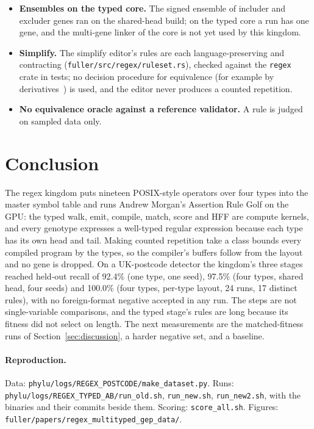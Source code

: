\documentclass[sigconf,nonacm]{acmart}
\newcommand{\src}[1]{{\small\nolinkurl{#1}}}
\begin{document}
\begin{itemize}
no multilingual measurement is reported.
\item \textbf{Ensembles on the typed core.} The signed ensemble of includer and
excluder genes ran on the shared-head build; on the typed core a run has one
gene, and the multi-gene linker of the core is not yet used by this kingdom.
\item \textbf{Simplify.} The simplify editor's rules are each language-preserving
and contracting (\src{fuller/src/regex/ruleset.rs}), checked against the
\texttt{regex} crate in tests; no decision procedure for equivalence (for example
by derivatives~\cite{brzozowski1964derivatives}) is used, and the editor never
produces a counted repetition.
\item \textbf{No equivalence oracle against a reference validator.} A rule is
judged on sampled data only.
\end{itemize}

\section{Conclusion}
\label{sec:conclusion}

The regex kingdom puts nineteen POSIX-style operators over four types into the
master symbol table and runs Andrew Morgan's Assertion Rule Golf on the GPU: the
typed walk, emit, compile, match, score and HFF are compute kernels, and every
genotype expresses a well-typed regular expression because each type has its own
head and tail. Making counted repetition take a class bounds every compiled
program by the types, so the compiler's buffers follow from the layout and no gene
is dropped. On a UK-postcode detector the kingdom's three stages reached held-out
recall of 92.4\% (one type, one seed), 97.5\% (four types, shared head, four
seeds) and 100.0\% (four types, per-type layout, 24 runs, 17 distinct rules), with no foreign-format
negative accepted in any run. The steps are not single-variable comparisons, and
the typed stage's rules are long because its fitness did not select on length.
The next measurements are the matched-fitness runs of
Section~\ref{sec:discussion}, a harder negative set, and a baseline.

\paragraph{Reproduction.} Data: \src{phylu/logs/REGEX_POSTCODE/make_dataset.py}.
Runs: \src{phylu/logs/REGEX_TYPED_AB/run_old.sh}, \src{run_new.sh},
\src{run_new2.sh}, with the binaries and their commits beside them. Scoring:
\src{score_all.sh}. Figures: \src{fuller/papers/regex_multityped_gep_data/}.



\end{document}
